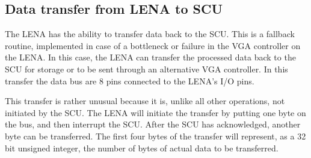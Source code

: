 \subsection{Data transfer from LENA to SCU}
The \ac{LENA} has the ability to transfer data back to the \ac{SCU}. This is a
fallback routine, implemented in case of a bottleneck or failure in the \ac{VGA}
controller on the \ac{LENA}. In this case, the \ac{LENA} can transfer the
processed data back to the \ac{SCU} for storage or to be sent through an
alternative \ac{VGA} controller. In this transfer the data bus are 8 pins
connected to the \ac{LENA}'s \ac{I/O} pins.

This transfer is rather unusual because it is, unlike all other operations, not
initiated by the \ac{SCU}. The \ac{LENA} will initiate the transfer by putting
one byte on the bus, and then interrupt the \ac{SCU}. After the \ac{SCU} has
acknowledged, another byte can be transferred. The first four bytes of the
transfer will represent, as a 32 bit unsigned integer, the number of bytes of
actual data to be transferred.

